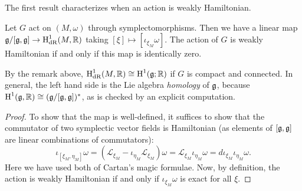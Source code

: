 \documentclass{amsart}
\begin{document}
The first result characterizes when an action is weakly Hamiltonian.
\begin{proposition}
    Let $G$ act on $(M,\omega)$ through symplectomorphisms. Then we have a linear map
    $\mathfrak g/[\mathfrak g, \mathfrak g]\to \operatorname{H}^1_\textrm{dR}(M,\mathbb{R})$ taking $[\xi]\mapsto[\iota_{\xi_M}\omega]$.
    The action of $G$ is weakly Hamiltonian if and only if this map is identically zero.
\end{proposition}
By the remark above, $\operatorname{H}^1_\textrm{dR}(M,\mathbb{R})\cong \operatorname{H}^1(\mathfrak g;\mathbb{R})$ if $G$ is compact and connected.
In general, the left hand side is the Lie algebra \textit{homology} of $\mathfrak g$, because
$\operatorname{H}^1(\mathfrak g,\mathbb{R})\cong (\mathfrak g/[\mathfrak g,\mathfrak g])^*$, as is checked by an explicit computation.

\begin{proof}
    To show that the map is well-defined, it suffices to show that the commutator of
    two symplectic vector fields is Hamiltonian (as elements of $[\mathfrak g, \mathfrak g]$ are
    linear combinations of commutators):
    \begin{equation*}
        \iota_{[\xi_M,\eta_M]}\omega = (\mathcal{L}_{\xi_M}-\iota_{\eta_M}\mathcal{L}_{\xi_M}) \omega= \mathcal{L}_{\xi_M}\iota_{\eta_M}\omega=d\iota_{\xi_M}\iota_{\eta_M}\omega.
    \end{equation*}
    Here we have used both of Cartan's magic formulae. Now, by definition, the action
    is weakly Hamiltonian if and only if $\iota_{\xi_M}\omega$ is exact for all $\xi$.
\end{proof}
\end{document}
